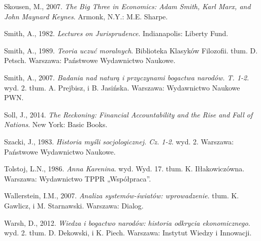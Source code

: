 \documentclass[a4paper]{article}
\begin{document}
Skousen, M., 2007. \textit{The Big Three in Economics: Adam Smith, Karl Marx, and John Maynard Keynes}. Armonk, N.Y.: M.E. Sharpe.

Smith, A., 1982. \textit{Lectures on Jurisprudence}. Indianapolis: Liberty Fund.

Smith, A., 1989. \textit{Teoria uczuć moralnych}. Biblioteka Klasyków Filozofii. tłum. D. Petsch. Warszawa: Państwowe Wydawnictwo Naukowe.

Smith, A., 2007. \textit{Badania nad naturą i przyczynami bogactwa narodów. T. 1-2}. wyd. 2. tłum. A. Prejbisz, i B. Jasińska. Warszawa: Wydawnictwo Naukowe PWN.

Soll, J., 2014. \textit{The Reckoning: Financial Accountability and the Rise and Fall of Nations}. New York: Basic Books.

Szacki, J., 1983. \textit{Historia myśli socjologicznej. Cz. 1-2}. wyd. 2. Warszawa: Państwowe Wydawnictwo Naukowe.

Tolstoj, L.N., 1986. \textit{Anna Karenina}. wyd. Wyd. 17. tłum. K. Iłłakowiczówna. Warszawa: Wydawnictwo TPPR „Współpraca”.

Wallerstein, I.M., 2007. \textit{Analiza systemów-światów: wprowadzenie}. tłum. K. Gawlicz, i M. Starnawski. Warszawa: Dialog.

Warsh, D., 2012. \textit{Wiedza i bogactwo narodów: historia odkrycia ekonomicznego}. wyd. 2. tłum. D. Dekowski, i K. Piech. Warszawa: Instytut Wiedzy i Innowacji.
\end{document}
